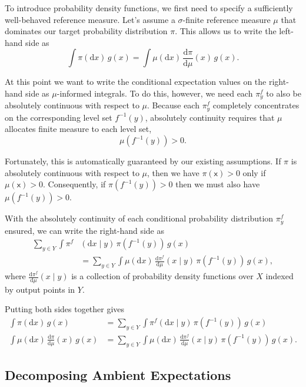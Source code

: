 \documentclass[
  letterpaper,
  DIV=11,
  numbers=noendperiod]{scrartcl}
\begin{document}
To introduce probability density functions, we first need to specify a
sufficiently well-behaved reference measure. Let's assume a
\(\sigma\)-finite reference measure \(\mu\) that dominates our target
probability distribution \(\pi\). This allows us to write the left-hand
side as \[
\int \pi( \mathrm{d} x ) \, g(x)
=
\int \mu( \mathrm{d} x ) \, \frac{ \mathrm{d}  \pi }{ \mathrm{d}  \mu  }(x) \, g(x).
\]

At this point we want to write the conditional expectation values on the
right-hand side as \(\mu\)-informed integrals. To do this, however, we
need each \(\pi^{f}_{y}\) to also be absolutely continuous with respect
to \(\mu\). Because each \(\pi^{f}_{y}\) completely concentrates on the
corresponding level set \(f^{-1}(y)\), absolutely continuity requires
that \(\mu\) allocates finite measure to each level set, \[
\mu( f^{-1}(y) ) > 0.
\]

Fortunately, this is automatically guaranteed by our existing
assumptions. If \(\pi\) is absolutely continuous with respect to
\(\mu\), then we have \(\pi(\mathsf{x}) > 0\) only if
\(\mu(\mathsf{x}) > 0\). Consequently, if \(\pi( f^{-1}(y) ) > 0\) then
we must also have \(\mu( f^{-1}(y) ) > 0\).

With the absolutely continuity of each conditional probability
distribution \(\pi^{f}_{y}\) ensured, we can write the right-hand side
as \begin{align*}
\sum_{y \in Y} \int \pi^{f} &( \mathrm{d} x \mid y ) \,
\pi ( f^{-1}(y) ) \, g(x)
\\
&=
\sum_{y \in Y} \int \mu( \mathrm{d} x) \,
\frac{ \mathrm{d}  \pi^{f} }{ \mathrm{d}  \mu  }( x \mid y ) \,
\pi ( f^{-1}(y) ) \, g(x),
\end{align*} where
\(\frac{ \mathrm{d}  \pi^{f} }{ \mathrm{d}  \mu  }( x \mid y )\) is a
collection of probability density functions over \(X\) indexed by output
points in \(Y\).

Putting both sides together gives \begin{align*}
\int \pi( \mathrm{d} x ) \, g(x)
&=
\sum_{y \in Y} \int \pi^{f}( \mathrm{d} x \mid y ) \,
\pi ( f^{-1}(y) ) \, g(x)
\\
\int \mu( \mathrm{d} x ) \, \frac{ \mathrm{d}  \pi }{ \mathrm{d}  \mu  }(x) \, g(x)
&=
\sum_{y \in Y} \int \mu( \mathrm{d} x) \,
\frac{ \mathrm{d}  \pi^{f} }{ \mathrm{d}  \mu  }( x \mid y ) \,
\pi ( f^{-1}(y) ) \, g(x).
\end{align*}

\subsection{Decomposing Ambient
Expectations}\label{decomposing-ambient-expectations}
\end{document}
